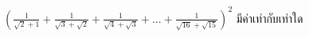 ﻿%
\question $(\frac{1}{\sqrt{2}+1} + \frac{1}{\sqrt{3}+\sqrt{2}}  + \frac{1}{\sqrt{4}+\sqrt{3}} + ... + \frac{1}{\sqrt{16}+\sqrt{15}})^2$ มีค่าเท่ากับเท่าใด
\newline
{}
